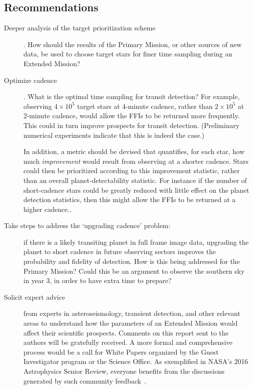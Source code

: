 \subsection{Recommendations}
\label{sec:recommendations}
\begin{description}
  
	\item[Deeper analysis of the target prioritization scheme]. How should the
	results of the Primary Mission, or other sources of new data, be used to
	choose target stars for finer time sampling during an Extended Mission?
	
        \item[Optimize cadence]. What is the optimal time sampling for transit detection? For example, observing $4\times10^5$ target stars at 
	      4-minute cadence, rather than $2\times10^5$ at 2-minute cadence,
	      would allow the FFIs to be returned more frequently.
	      This could in turn improve prospects for transit detection.  
	      (Preliminary numerical experiments indicate that this is indeed the 
	      case.)
	      
	      In addition, a metric should be devised that
        quantifies, for each star, how much {\it improvement} would
        result from observing at a shorter cadence.
        Stars could then be prioritized according to this improvement
	statistic, rather than an overall planet-detectability statistic.
        For instance if the number of short-cadence stars could be 
        greatly reduced with little effect on the planet detection
        statistics, then this might allow the FFIs to be returned at a
        higher cadence..
	
	\item[Take steps to address the `upgrading cadence' problem:]
          if there is a likely transiting planet in full frame image
          data, upgrading the planet to short cadence in future
          observing sectors improves the probability and fidelity of
          detection. How is this being addressed for the Primary Mission?
          Could this be an argument to observe the southern
          sky in year 3, in order to have extra time to prepare?
	
	\item[Solicit expert advice] from experts in asteroseismology, transient detection,
	and other relevant areas to understand how the parameters of an Extended Mission
          would affect their scientific prospects. Comments on this report sent to
	  the authors will be gratefully received. A more formal and comprehensive process would
          be a call for White Papers organized
	  by the Guest Investigator program or the \tess Science Office. As
          exemplified in NASA’s 2016 Astrophysics Senior Review,
          everyone benefits from the discussions generated by such
          community feedback~\citep{donahue_senior_2016}.
	

\end{description}
